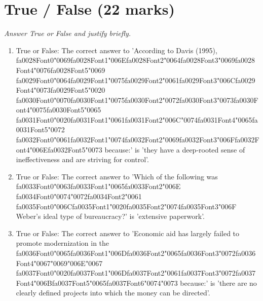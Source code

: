 \documentclass[12pt]{article}
\begin{document}
\section*{True / False (22 marks)}
\textit{Answer True or False and justify briefly.}
\begin{enumerate}[label=\arabic*.]
\item True or False: The correct answer to 'According to Davis (1995), {\csname fa0028Font0\endcsname\char"0069}{\csname fa0028Font1\endcsname\char"006E}{\csname fa0028Font2\endcsname\char"0064}{\csname fa0028Font3\endcsname\char"0069}{\csname fa0028Font4\endcsname\char"0076}{\csname fa0028Font5\endcsname\char"0069} {\csname fa0029Font0\endcsname\char"0064}{\csname fa0029Font1\endcsname\char"0075}{\csname fa0029Font2\endcsname\char"0061}{\csname fa0029Font3\endcsname\char"006C}{\csname fa0029Font4\endcsname\char"0073}{\csname fa0029Font5\endcsname\char"0020} {\csname fa0030Font0\endcsname\char"0070}{\csname fa0030Font1\endcsname\char"0075}{\csname fa0030Font2\endcsname\char"0072}{\csname fa0030Font3\endcsname\char"0073}{\csname fa0030Font4\endcsname\char"0075}{\csname fa0030Font5\endcsname\char"0065} {\csname fa0031Font0\endcsname\char"0020}{\csname fa0031Font1\endcsname\char"0061}{\csname fa0031Font2\endcsname\char"006C}{\char"0074}{\csname fa0031Font4\endcsname\char"0065}{\csname fa0031Font5\endcsname\char"0072} {\csname fa0032Font0\endcsname\char"0061}{\csname fa0032Font1\endcsname\char"0074}{\csname fa0032Font2\endcsname\char"0069}{\csname fa0032Font3\endcsname\char"006F}{\csname fa0032Font4\endcsname\char"006E}{\csname fa0032Font5\endcsname\char"0073} because:' is 'they have a deep-rooted sense of ineffectiveness and are striving for control'.
\item True or False: The correct answer to 'Which of the following was {\csname fa0033Font0\endcsname\char"0063}{\csname fa0033Font1\endcsname\char"0065}{\csname fa0033Font2\endcsname\char"006E} {\csname fa0034Font0\endcsname\char"0074}{\char"0072}{\csname fa0034Font2\endcsname\char"0061} {\csname fa0035Font0\endcsname\char"006C}{\csname fa0035Font1\endcsname\char"0020}{\csname fa0035Font2\endcsname\char"0074}{\csname fa0035Font3\endcsname\char"006F} Weber's ideal type of bureaucracy?' is 'extensive paperwork'.
\item True or False: The correct answer to 'Economic aid has largely failed to promote modernization in the {\csname fa0036Font0\endcsname\char"0065}{\csname fa0036Font1\endcsname\char"006D}{\csname fa0036Font2\endcsname\char"0065}{\csname fa0036Font3\endcsname\char"0072}{\csname fa0036Font4\endcsname\char"0067}{\char"0069}{\char"006E}{\char"0067} {\csname fa0037Font0\endcsname\char"0020}{\csname fa0037Font1\endcsname\char"006D}{\csname fa0037Font2\endcsname\char"0061}{\csname fa0037Font3\endcsname\char"0072}{\csname fa0037Font4\endcsname\char"006B}{\csname fa0037Font5\endcsname\char"0065}{\csname fa0037Font6\endcsname\char"0074}{\char"0073} because:' is 'there are no clearly defined projects into which the money can be directed'.

\end{enumerate}
\end{document}
